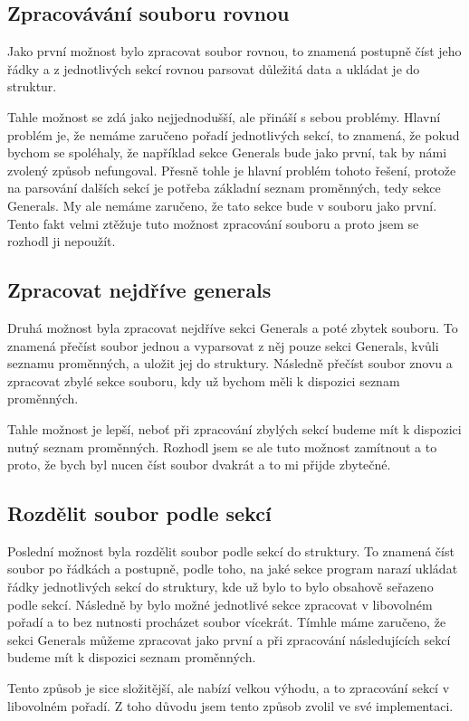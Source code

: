 \documentclass[a4paper,12pt,oneside]{report}
\begin{document}
\subsection{Zpracovávání souboru rovnou}
Jako první možnost bylo zpracovat soubor rovnou, to znamená postupně číst jeho řádky a z jednotlivých sekcí rovnou parsovat důležitá data a ukládat je do struktur.\par
Tahle možnost se zdá jako nejjednodušší, ale přináší s sebou problémy. Hlavní problém je, že nemáme zaručeno pořadí jednotlivých sekcí, to 
znamená, že pokud bychom se spoléhaly, že například sekce Generals bude jako první, tak by námi zvolený způsob nefungoval. Přesně tohle je hlavní 
problém tohoto řešení, protože na parsování dalších sekcí je potřeba základní seznam proměnných, tedy sekce Generals. My ale nemáme
zaručeno, že tato sekce bude v souboru jako první. Tento fakt velmi ztěžuje tuto možnost zpracování souboru a proto jsem se rozhodl ji nepoužít.

\subsection{Zpracovat nejdříve generals}
Druhá možnost byla zpracovat nejdříve sekci Generals a poté zbytek souboru. To znamená přečíst soubor jednou a vyparsovat z něj pouze
sekci Generals, kvůli seznamu proměnných, a uložit jej do struktury. Následně přečíst soubor znovu a zpracovat zbylé sekce souboru, kdy už 
bychom měli k dispozici seznam proměnných.\par Tahle možnost je lepší, neboť při zpracování zbylých sekcí budeme mít k dispozici nutný seznam proměnných.
Rozhodl jsem se ale tuto možnost zamítnout a to proto, že bych byl nucen číst soubor dvakrát a to mi přijde zbytečné.

\subsection{Rozdělit soubor podle sekcí}
Poslední možnost byla rozdělit soubor podle sekcí do struktury. To znamená číst soubor po řádkách a postupně, podle toho, na 
jaké sekce program narazí ukládat řádky jednotlivých sekcí do struktury, kde už bylo to bylo obsahově seřazeno podle sekcí.
Následně by bylo možné jednotlivé sekce zpracovat v libovolném pořadí a to bez nutnosti procházet soubor vícekrát. Tímhle máme 
zaručeno, že sekci Generals můžeme zpracovat jako první a při zpracování následujících sekcí budeme mít k dispozici seznam proměnných.\par
Tento způsob je sice složitější, ale nabízí velkou výhodu, a to zpracování sekcí v libovolném pořadí. Z toho důvodu jsem tento způsob zvolil
ve své implementaci.
\end{document}
